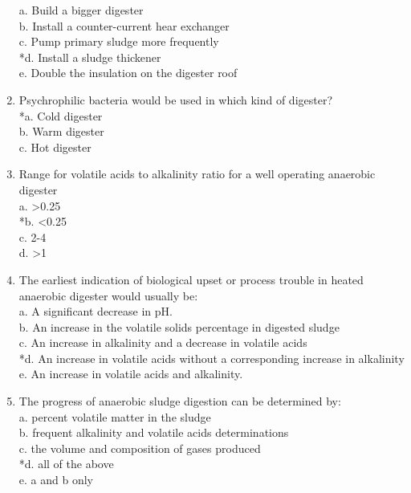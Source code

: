 \documentclass{article}
\begin{document}
\begin{enumerate}
a. Build a bigger digester \\
b. Install a counter-current hear exchanger \\
c. Pump primary sludge more frequently \\
*d. Install a sludge thickener \\
e. Double the insulation on the digester roof \\

\item  Psychrophilic bacteria would be used in which kind of digester? \\

*a. Cold digester \\
b. Warm digester \\
c. Hot digester \\

\item  Range for volatile acids to alkalinity ratio for a well operating anaerobic digester \\

a. >0.25 \\
*b. <0.25 \\
c. 2-4 \\
d. >1 \\

\item  The earliest indication of biological upset or process trouble in heated anaerobic digester would usually be: \\

a. A significant decrease in pH. \\
b. An increase in the volatile solids percentage in digested sludge \\
c. An increase in alkalinity and a decrease in volatile acids \\
*d. An increase in volatile acids without a corresponding increase in alkalinity \\
e. An increase in volatile acids and alkalinity. \\

\item  The progress of anaerobic sludge digestion can be determined by: \\

a. percent volatile matter in the sludge \\
b. frequent alkalinity and volatile acids determinations \\
c. the volume and composition of gases produced \\
*d. all of the above \\
e. a and b only \\


\end{enumerate}
\end{document}
